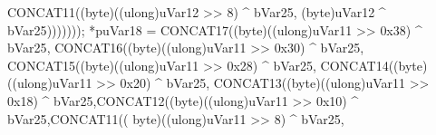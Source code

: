 \documentclass[
]{article}
\newenvironment{Shaded}{}{}
\newcommand{\BaseNTok}[1]{\textcolor[rgb]{0.25,0.63,0.44}{#1}}
\newcommand{\DecValTok}[1]{\textcolor[rgb]{0.25,0.63,0.44}{#1}}
\newcommand{\ExtensionTok}[1]{#1}
\newcommand{\NormalTok}[1]{#1}
\newcommand{\OperatorTok}[1]{\textcolor[rgb]{0.40,0.40,0.40}{#1}}
\begin{document}
\begin{Shaded}
\begin{Highlighting}[]
\NormalTok{                                                  CONCAT11}\OperatorTok{((}\NormalTok{byte}\OperatorTok{)((}\ExtensionTok{ulong}\OperatorTok{)}\NormalTok{uVar12 }\OperatorTok{\textgreater{}\textgreater{}} \DecValTok{8}\OperatorTok{)} \OperatorTok{\^{}}\NormalTok{ bVar25}\OperatorTok{,}
                                                           \OperatorTok{(}\NormalTok{byte}\OperatorTok{)}\NormalTok{uVar12 }\OperatorTok{\^{}}\NormalTok{ bVar25}\OperatorTok{)))))));}
        \OperatorTok{*}\NormalTok{puVar18 }\OperatorTok{=}\NormalTok{ CONCAT17}\OperatorTok{((}\NormalTok{byte}\OperatorTok{)((}\ExtensionTok{ulong}\OperatorTok{)}\NormalTok{uVar11 }\OperatorTok{\textgreater{}\textgreater{}} \BaseNTok{0x38}\OperatorTok{)} \OperatorTok{\^{}}\NormalTok{ bVar25}\OperatorTok{,}
\NormalTok{                            CONCAT16}\OperatorTok{((}\NormalTok{byte}\OperatorTok{)((}\ExtensionTok{ulong}\OperatorTok{)}\NormalTok{uVar11 }\OperatorTok{\textgreater{}\textgreater{}} \BaseNTok{0x30}\OperatorTok{)} \OperatorTok{\^{}}\NormalTok{ bVar25}\OperatorTok{,}
\NormalTok{                                     CONCAT15}\OperatorTok{((}\NormalTok{byte}\OperatorTok{)((}\ExtensionTok{ulong}\OperatorTok{)}\NormalTok{uVar11 }\OperatorTok{\textgreater{}\textgreater{}} \BaseNTok{0x28}\OperatorTok{)} \OperatorTok{\^{}}\NormalTok{ bVar25}\OperatorTok{,}
\NormalTok{                                              CONCAT14}\OperatorTok{((}\NormalTok{byte}\OperatorTok{)((}\ExtensionTok{ulong}\OperatorTok{)}\NormalTok{uVar11 }\OperatorTok{\textgreater{}\textgreater{}} \BaseNTok{0x20}\OperatorTok{)} \OperatorTok{\^{}}\NormalTok{ bVar25}\OperatorTok{,}
\NormalTok{                                                       CONCAT13}\OperatorTok{((}\NormalTok{byte}\OperatorTok{)((}\ExtensionTok{ulong}\OperatorTok{)}\NormalTok{uVar11 }\OperatorTok{\textgreater{}\textgreater{}} \BaseNTok{0x18}\OperatorTok{)} \OperatorTok{\^{}}
\NormalTok{                                                                bVar25}\OperatorTok{,}\NormalTok{CONCAT12}\OperatorTok{((}\NormalTok{byte}\OperatorTok{)((}\ExtensionTok{ulong}\OperatorTok{)}\NormalTok{uVar11}
                                                                                      \OperatorTok{\textgreater{}\textgreater{}} \BaseNTok{0x10}\OperatorTok{)} \OperatorTok{\^{}}
\NormalTok{                                                                                bVar25}\OperatorTok{,}\NormalTok{CONCAT11}\OperatorTok{((}
\NormalTok{                                                  byte}\OperatorTok{)((}\ExtensionTok{ulong}\OperatorTok{)}\NormalTok{uVar11 }\OperatorTok{\textgreater{}\textgreater{}} \DecValTok{8}\OperatorTok{)} \OperatorTok{\^{}}\NormalTok{ bVar25}\OperatorTok{,}

\end{Highlighting}
\end{Shaded}
\end{document}
